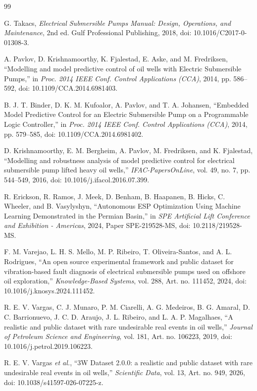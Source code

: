 \documentclass[conference]{IEEEtran}
\begin{document}
\begin{thebibliography}{99}

G. Takacs, \emph{Electrical Submersible Pumps Manual: Design, Operations, and Maintenance}, 2nd ed. Gulf Professional Publishing, 2018, doi: 10.1016/C2017-0-01308-3.

A. Pavlov, D. Krishnamoorthy, K. Fjalestad, E. Aske, and M. Fredriksen, ``Modelling and model predictive control of oil wells with Electric Submersible Pumps,'' in \emph{Proc. 2014 IEEE Conf. Control Applications (CCA)}, 2014, pp. 586--592, doi: 10.1109/CCA.2014.6981403.

B. J. T. Binder, D. K. M. Kufoalor, A. Pavlov, and T. A. Johansen, ``Embedded Model Predictive Control for an Electric Submersible Pump on a Programmable Logic Controller,'' in \emph{Proc. 2014 IEEE Conf. Control Applications (CCA)}, 2014, pp. 579--585, doi: 10.1109/CCA.2014.6981402.

D. Krishnamoorthy, E. M. Bergheim, A. Pavlov, M. Fredriksen, and K. Fjalestad, ``Modelling and robustness analysis of model predictive control for electrical submersible pump lifted heavy oil wells,'' \emph{IFAC-PapersOnLine}, vol. 49, no. 7, pp. 544--549, 2016, doi: 10.1016/j.ifacol.2016.07.399.

R. Erickson, R. Ramos, J. Meek, D. Benham, B. Haapanen, B. Hicks, C. Wheeler, and B. Vasylyshyn, ``Autonomous ESP Optimization Using Machine Learning Demonstrated in the Permian Basin,'' in \emph{SPE Artificial Lift Conference and Exhibition - Americas}, 2024, Paper SPE-219528-MS, doi: 10.2118/219528-MS.

F. M. Varejao, L. H. S. Mello, M. P. Ribeiro, T. Oliveira-Santos, and A. L. Rodrigues, ``An open source experimental framework and public dataset for vibration-based fault diagnosis of electrical submersible pumps used on offshore oil exploration,'' \emph{Knowledge-Based Systems}, vol. 288, Art. no. 111452, 2024, doi: 10.1016/j.knosys.2024.111452.

R. E. V. Vargas, C. J. Munaro, P. M. Ciarelli, A. G. Medeiros, B. G. Amaral, D. C. Barrionuevo, J. C. D. Araujo, J. L. Ribeiro, and L. A. P. Magalhaes, ``A realistic and public dataset with rare undesirable real events in oil wells,'' \emph{Journal of Petroleum Science and Engineering}, vol. 181, Art. no. 106223, 2019, doi: 10.1016/j.petrol.2019.106223.

R. E. V. Vargas \emph{et al.}, ``3W Dataset 2.0.0: a realistic and public dataset with rare undesirable real events in oil wells,'' \emph{Scientific Data}, vol. 13, Art. no. 949, 2026, doi: 10.1038/s41597-026-07225-z.


\end{thebibliography}
\end{document}
